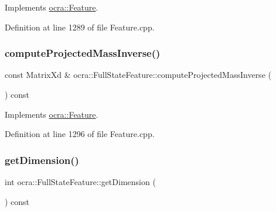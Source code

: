 Implements \hyperlink{classocra_1_1Feature_ac529096b3fe8eba1ab88a56d8b042d37}{ocra\+::\+Feature}.



Definition at line 1289 of file Feature.\+cpp.

\hypertarget{classocra_1_1FullStateFeature_a1b3231544c745efacc3665f567bb4402}{}\label{classocra_1_1FullStateFeature_a1b3231544c745efacc3665f567bb4402} 
\subsubsection{\texorpdfstring{compute\+Projected\+Mass\+Inverse()}{computeProjectedMassInverse()}\hspace{0.1cm}{\footnotesize\ttfamily [2/2]}}
{\footnotesize\ttfamily const Matrix\+Xd \& ocra\+::\+Full\+State\+Feature\+::compute\+Projected\+Mass\+Inverse (\begin{DoxyParamCaption}{ }\end{DoxyParamCaption}) const\hspace{0.3cm}{\ttfamily [virtual]}}



Implements \hyperlink{classocra_1_1Feature_ac27bcbdbb8541e3b4e2c77a6d6f2ffc0}{ocra\+::\+Feature}.



Definition at line 1296 of file Feature.\+cpp.

\hypertarget{classocra_1_1FullStateFeature_a62b4a9dd7055ab47105c8aefaa45611a}{}\label{classocra_1_1FullStateFeature_a62b4a9dd7055ab47105c8aefaa45611a} 
\subsubsection{\texorpdfstring{get\+Dimension()}{getDimension()}}
{\footnotesize\ttfamily int ocra\+::\+Full\+State\+Feature\+::get\+Dimension (\begin{DoxyParamCaption}{ }\end{DoxyParamCaption}) const\hspace{0.3cm}{\ttfamily [virtual]}}



